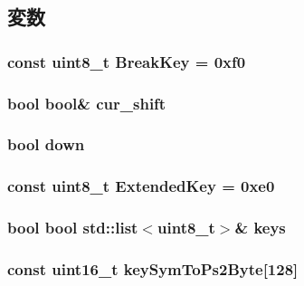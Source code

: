 \subsection{変数}
\hypertarget{namespacePs2_a55ae7a700898fcdd9b19b560422197d1}{
\subsubsection[{BreakKey}]{\setlength{\rightskip}{0pt plus 5cm}const uint8\_\-t {\bf BreakKey} = 0xf0}}
\label{namespacePs2_a55ae7a700898fcdd9b19b560422197d1}
\hypertarget{namespacePs2_a7110d60593b39f7b7eba87904e2ae359}{
\subsubsection[{cur\_\-shift}]{\setlength{\rightskip}{0pt plus 5cm}bool bool\& {\bf cur\_\-shift}}}
\label{namespacePs2_a7110d60593b39f7b7eba87904e2ae359}
\hypertarget{namespacePs2_ac30355235d44e8f7b0a538a510bcbbeb}{
\subsubsection[{down}]{\setlength{\rightskip}{0pt plus 5cm}bool {\bf down}}}
\label{namespacePs2_ac30355235d44e8f7b0a538a510bcbbeb}
\hypertarget{namespacePs2_a6dc2041a4414c52e454ac11cc1c0d657}{
\subsubsection[{ExtendedKey}]{\setlength{\rightskip}{0pt plus 5cm}const uint8\_\-t {\bf ExtendedKey} = 0xe0}}
\label{namespacePs2_a6dc2041a4414c52e454ac11cc1c0d657}
\hypertarget{namespacePs2_a9c0125dcc49548ab16bf4d1b20c4b381}{
\subsubsection[{keys}]{\setlength{\rightskip}{0pt plus 5cm}bool bool {\bf std::list}$<$uint8\_\-t$>$\& {\bf keys}}}
\label{namespacePs2_a9c0125dcc49548ab16bf4d1b20c4b381}
\hypertarget{namespacePs2_a23aeb10a3924a5bdb7f4f9e21b03e515}{
\subsubsection[{keySymToPs2Byte}]{\setlength{\rightskip}{0pt plus 5cm}const uint16\_\-t {\bf keySymToPs2Byte}\mbox{[}128\mbox{]}}}
